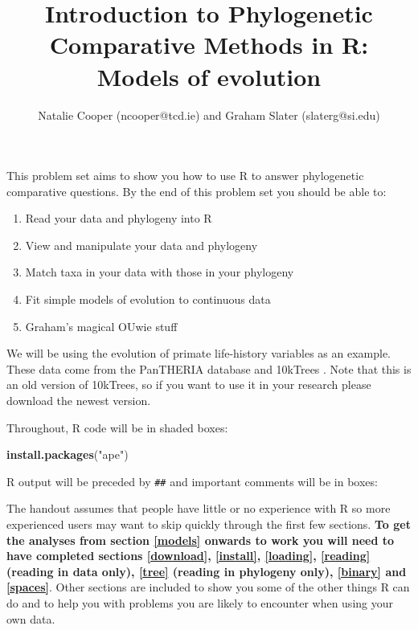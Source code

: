 \documentclass[11pt]{article}
\newcommand{\KeywordTok}[1]{\textcolor[rgb]{0.13,0.29,0.53}{\textbf{{#1}}}}
\newcommand{\StringTok}[1]{\textcolor[rgb]{0.31,0.60,0.02}{{#1}}}
\newcommand{\NormalTok}[1]{{#1}}
\begin{document}
\title{Introduction to Phylogenetic Comparative Methods in R: Models of evolution}
\author{Natalie Cooper (ncooper@tcd.ie) and Graham Slater (slaterg@si.edu)}
\date{}
\maketitle

This problem set aims to show you how to use R to answer phylogenetic 
comparative questions. By the end of this problem set you should be able to:

\begin{enumerate}
\item Read your data and phylogeny into R
\item View and manipulate your data and phylogeny
\item Match taxa in your data with those in your phylogeny
\item Fit simple models of evolution to continuous data
\item Graham's magical OUwie stuff
\end{enumerate}

We will be using the evolution of primate life-history variables as an
example. These data come from the PanTHERIA database \citep{jones2009pantheria} and 10kTrees \citep{arnold201010ktrees}. Note that this is an old version of 10kTrees, so if you want to use it in your research please download the newest version.

Throughout, R code will be in shaded boxes:

\begin{snugshade}
\begin{Highlighting}[]
\KeywordTok{install.packages}\NormalTok{(}\StringTok{"ape"}\NormalTok{)}
\end{Highlighting}
\end{snugshade}

R output will be preceded by \texttt{\#\#} and important comments will be in boxes:

\begin{framed}

The handout assumes that people have little or no experience with R so 
more experienced users may want to skip quickly through the first 
few sections. \textbf{To get the analyses from section \ref{models} onwards to work you 
will need to have completed sections \ref{download}, \ref{install}, \ref{loading}, \ref{reading} (reading in data only), 
\ref{tree} (reading in phylogeny only), \ref{binary} and \ref{spaces}}. Other sections are included to show 
you some of the other things R can do and to help you with problems you are 
likely to encounter when using your own data. 
\end{framed}
\end{document}
